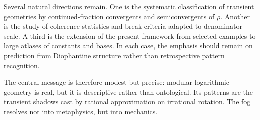 \documentclass[11pt]{article}
\begin{document}
Several natural directions remain. One is the systematic classification of transient geometries by continued-fraction convergents and semiconvergents of $\rho$. Another is the study of coherence statistics and break criteria adapted to denominator scale. A third is the extension of the present framework from selected examples to large atlases of constants and bases. In each case, the emphasis should remain on prediction from Diophantine structure rather than retrospective pattern recognition.

The central message is therefore modest but precise: modular logarithmic geometry is real, but it is descriptive rather than ontological. Its patterns are the transient shadows cast by rational approximation on irrational rotation. The fog resolves not into metaphysics, but into mechanics.
\end{document}
